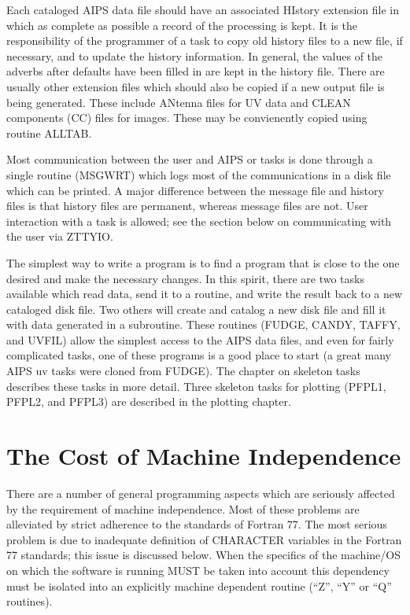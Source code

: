 Each cataloged AIPS data file should have an associated HIstory
extension file in which as complete as possible a record of the
processing is kept. It is the responsibility of the programmer of a
task to copy old history files to a new file, if necessary, and to
update the history information. In general, the values of the adverbs
after defaults have been filled in are kept in the history file. There
are usually other extension files which should also be copied if a new
output file is being generated.  These include ANtenna files for UV
data and CLEAN components (CC) files for images.  These may be
convienently copied using routine ALLTAB.

Most communication between the user and AIPS or tasks is done through
a single routine (MSGWRT) which logs most of the communications in
a disk file which can be printed. A major difference between the
message file and history files is that history files are permanent,
whereas message files are not. User interaction with a task is
allowed; see the section below on communicating with the user via
ZTTYIO.

The simplest way to write a program is to find a program that is close
to the one desired and make the necessary changes.  In this spirit,
there are two tasks available which read data, send it to a routine,
and write the result back to a new cataloged disk file. Two others
will create and catalog a new disk file and fill it with data
generated in a subroutine.  These routines (FUDGE, CANDY, TAFFY, and
UVFIL) allow the simplest access to the AIPS data files, and even for
fairly complicated tasks, one of these programs is a good place to
start (a great many AIPS uv tasks were cloned from FUDGE). The chapter
on skeleton tasks describes these tasks in more detail. Three skeleton
tasks for plotting (PFPL1, PFPL2, and PFPL3) are described in the
plotting chapter.


\section{The Cost of Machine Independence}
 There are a number of general programming aspects which are seriously
affected by the requirement of machine independence. Most of these
problems are alleviated by strict adherence to the standards of
Fortran 77.  The most serious problem is due to inadequate definition
of CHARACTER variables in the Fortran 77 standards; this issue is
discussed below.  When the specifics of the machine/OS on which the
software is running MUST be taken into account this dependency must be
isolated into an explicitly machine dependent routine (``Z'', ``Y'' or
``Q'' routines).

